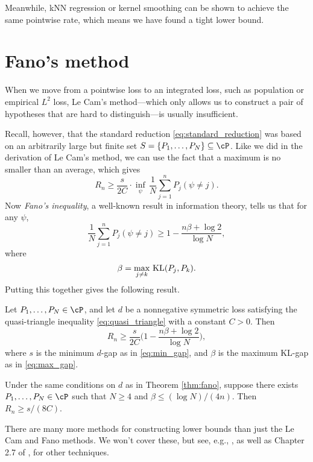 \documentclass{article}
\begin{document}
Meanwhile, kNN regression or kernel smoothing can be shown to achieve the same
pointwise rate, which means we have found a tight lower bound.

\section{Fano's method}

When we move from a pointwise loss to an integrated loss, such as population or 
empirical $L^2$ loss, Le Cam's method---which only allows us to construct a pair  
of hypotheses that are hard to distinguish---is usually insufficient. 

Recall, however, that the standard reduction \eqref{eq:standard_reduction} was 
based on an arbitrarily large but finite set $S = \{P_1,\dots,P_N\} \subseteq
\cP$. Like we did in the derivation of Le Cam's method, we can use the fact that
a maximum is no smaller than an average, which gives 
\[
R_n \geq \frac{s}{2C} \cdot \inf_\psi \, \frac{1}{N} \sum_{j=1}^n P_j (\psi 
\not= j). 
\]
Now \emph{Fano's inequality}, a well-known result in information theory, tells
us that for any $\psi$,  
\[
\frac{1}{N} \sum_{j=1}^n P_j (\psi \not= j) \geq 1 - \frac{n\beta + \log 2}{\log
  N}, 
\]
where 
\begin{equation}
\label{eq:max_gap}
\beta = \max_{j \not= k} \, \mathrm{KL}(P_j, P_k).
\end{equation}
Putting this together gives the following result.

\begin{theorem}
\label{thm:fano}
Let $P_1,\dots,P_N \in \cP$, and let $d$ be a nonnegative symmetric loss
satisfying the quasi-triangle inequality \eqref{eq:quasi_triangle} with a
constant $C>0$. Then 
\begin{equation}
\label{eq:fano}
R_n \geq \frac{s}{2C} \bigg( 1 - \frac{n\beta + \log 2}{\log N} \bigg),
\end{equation}
where $s$ is the minimum $d$-gap as in \eqref{eq:min_gap}, and $\beta$ is the
maximum KL-gap as in \eqref{eq:max_gap}.
\end{theorem}

\begin{corollary}
\label{cor:fano}
Under the same conditions on $d$ as in Theorem \ref{thm:fano}, suppose there 
exists $P_1,\dots,P_N \in \cP$ such that $N \geq 4$ and $\beta \leq (\log
N)/(4n)$. Then $R_n \geq s/(8C)$.
\end{corollary}

There are many more methods for constructing lower bounds than just the Le Cam
and Fano methods. We won't cover these, but see, e.g., \citet{yu1997assouad,
  yang1999information}, as well as Chapter 2.7 of
\citet{tsybakov2009introduction}, for other techniques. 
\end{document}
